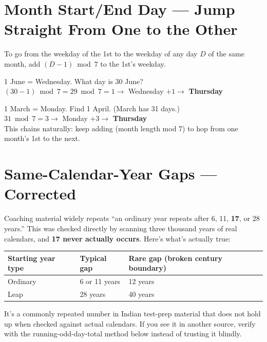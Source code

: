 \documentclass[11pt]{article}
\begin{document}
\section{Month Start/End Day --- Jump Straight From One to the Other}

\begin{formulabox}[Rule]
To go from the weekday of the 1st to the weekday of any day $D$ of the same month, add
$(D-1) \bmod 7$ to the 1st's weekday.
\end{formulabox}

\begin{examplebox}
1 June = Wednesday. What day is 30 June? \\
$(30-1) \bmod 7 = 29 \bmod 7 = 1 \to$ Wednesday $+1 \to$ \textbf{Thursday}
\end{examplebox}

\begin{examplebox}
1 March = Monday. Find 1 April. (March has 31 days.) \\
$31 \bmod 7 = 3 \to$ Monday $+3 \to$ \textbf{Thursday} \\
This chains naturally: keep adding (month length mod 7) to hop from one month's 1st to the next.
\end{examplebox}

\section{Same-Calendar-Year Gaps --- Corrected}

Coaching material widely repeats ``an ordinary year repeats after 6, 11, \textbf{17}, or 28 years.''
This was checked directly by scanning three thousand years of real calendars, and \textbf{17 never
actually occurs}. Here's what's actually true:

\begin{center}
\begin{tabular}{lll}
\toprule
\textbf{Starting year type} & \textbf{Typical gap} & \textbf{Rare gap (broken century boundary)} \\
\midrule
Ordinary & 6 or 11 years & 12 years \\
Leap & 28 years & 40 years \\
\bottomrule
\end{tabular}
\end{center}

\begin{warnbox}
It's a commonly repeated number in Indian test-prep material that does not hold up when checked
against actual calendars. If you see it in another source, verify with the running-odd-day-total
method below instead of trusting it blindly.
\end{warnbox}
\end{document}
